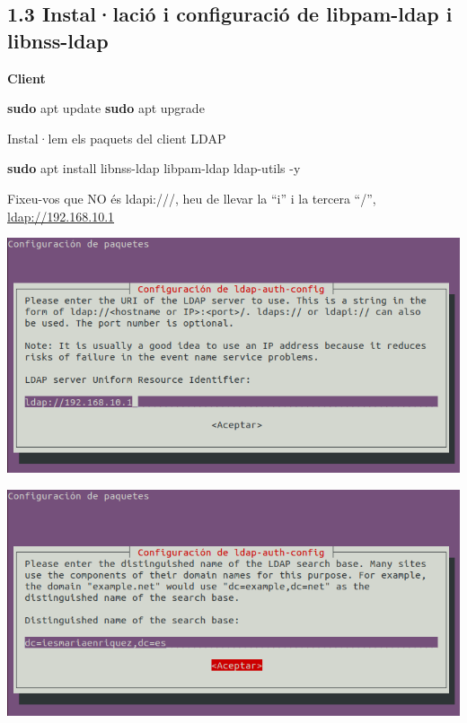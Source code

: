 \documentclass[
  12 pt,
  a4paper,
]{article}
\newenvironment{Shaded}{\begin{snugshade}}{\end{snugshade}}
\newcommand{\AttributeTok}[1]{\textcolor[rgb]{0.13,0.29,0.53}{#1}}
\newcommand{\FunctionTok}[1]{\textcolor[rgb]{0.13,0.29,0.53}{\textbf{#1}}}
\newcommand{\NormalTok}[1]{#1}
\begin{document}
\subsection{1.3 Instal·lació i configuració de libpam-ldap i
libnss-ldap}\label{installaciuxf3-i-configuraciuxf3-de-libpam-ldap-i-libnss-ldap}

\textbf{Client}

\begin{Shaded}
\begin{Highlighting}[]
\FunctionTok{sudo}\NormalTok{ apt update}
\FunctionTok{sudo}\NormalTok{ apt upgrade}
\end{Highlighting}
\end{Shaded}

Instal·lem els paquets del client LDAP

\begin{Shaded}
\begin{Highlighting}[]
\FunctionTok{sudo}\NormalTok{ apt install libnss{-}ldap libpam{-}ldap ldap{-}utils }\AttributeTok{{-}y}
\end{Highlighting}
\end{Shaded}

Fixeu-vos que NO és ldapi:///, heu de llevar la ``i'' i la tercera
``/'', \url{ldap://192.168.10.1}

\includegraphics{png/libpam1.png}

\includegraphics{png/libpam2.png}
\end{document}
